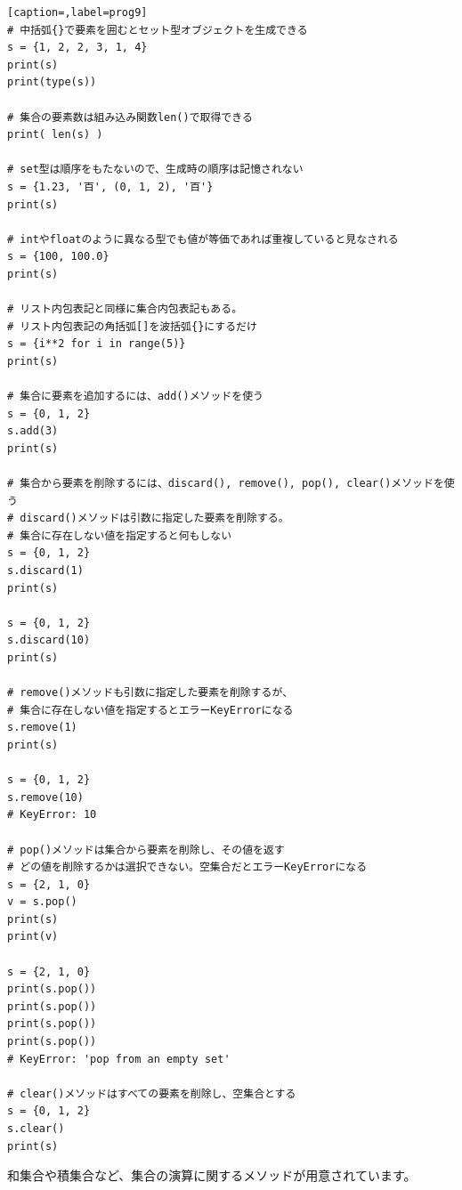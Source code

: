 \documentclass[uplatex,a4paper,11pt,oneside,openany]{jsbook}
\begin{document}
\begin{lstlisting}[caption=,label=prog9]
# 中括弧{}で要素を囲むとセット型オブジェクトを生成できる
s = {1, 2, 2, 3, 1, 4}
print(s)
print(type(s))

# 集合の要素数は組み込み関数len()で取得できる
print( len(s) )

# set型は順序をもたないので、生成時の順序は記憶されない
s = {1.23, '百', (0, 1, 2), '百'}
print(s)

# intやfloatのように異なる型でも値が等価であれば重複していると見なされる
s = {100, 100.0}
print(s)

# リスト内包表記と同様に集合内包表記もある。
# リスト内包表記の角括弧[]を波括弧{}にするだけ
s = {i**2 for i in range(5)}
print(s)

# 集合に要素を追加するには、add()メソッドを使う
s = {0, 1, 2}
s.add(3)
print(s)

# 集合から要素を削除するには、discard(), remove(), pop(), clear()メソッドを使う
# discard()メソッドは引数に指定した要素を削除する。
# 集合に存在しない値を指定すると何もしない
s = {0, 1, 2}
s.discard(1)
print(s)

s = {0, 1, 2}
s.discard(10)
print(s)

# remove()メソッドも引数に指定した要素を削除するが、
# 集合に存在しない値を指定するとエラーKeyErrorになる
s.remove(1)
print(s)

s = {0, 1, 2}
s.remove(10)
# KeyError: 10

# pop()メソッドは集合から要素を削除し、その値を返す
# どの値を削除するかは選択できない。空集合だとエラーKeyErrorになる
s = {2, 1, 0}
v = s.pop()
print(s)
print(v)

s = {2, 1, 0}
print(s.pop())
print(s.pop())
print(s.pop())
print(s.pop())
# KeyError: 'pop from an empty set'

# clear()メソッドはすべての要素を削除し、空集合とする
s = {0, 1, 2}
s.clear()
print(s)
\end{lstlisting}%

和集合や積集合など、集合の演算に関するメソッドが用意されています。
\end{document}
